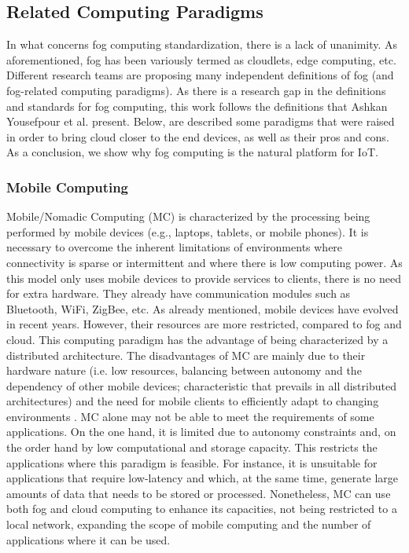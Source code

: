 \subsection{Related Computing Paradigms}
\label{sec:Computingparadigms}
\noindent In what concerns fog computing standardization, there is a lack of unanimity. As aforementioned, fog has been variously termed as cloudlets, edge computing, etc. Different research teams are proposing many independent definitions of fog (and fog-related computing paradigms). As there is a research gap in the definitions and standards for fog computing, this work follows the definitions that Ashkan Yousefpour et al. \cite{yousefpour2018all} present. Below, are described some paradigms that were raised in order to bring cloud closer to the end devices, as well as their pros and cons. As a conclusion, we show why fog computing is the natural platform for IoT.

\subsubsection{Mobile Computing}\label{subsec:MC}
\noindent Mobile/Nomadic Computing (MC) is characterized by the processing being performed by mobile devices (e.g., laptops, tablets, or mobile phones). It is necessary to overcome the inherent limitations of environments where connectivity is sparse or intermittent and where there is low computing power. As this model only uses mobile devices to provide services to clients, there is no need for extra hardware. They already have communication modules such as Bluetooth, WiFi, ZigBee, etc. As already mentioned, mobile devices have evolved in recent years. However, their resources are more restricted, compared to fog and cloud. This computing paradigm has the advantage of being characterized by a distributed architecture. The disadvantages of MC are mainly due to their hardware nature (i.e. low resources, balancing between autonomy and the dependency of other mobile devices; characteristic that prevails in all distributed architectures) and the need for mobile clients to efficiently adapt to changing environments \cite{satyanarayanan1996fundamental}. MC alone may not be able to meet the requirements of some applications. On the one hand, it is limited due to autonomy constraints and, on the order hand by low computational and storage capacity. This restricts the applications where this paradigm is feasible. For instance, it is unsuitable for applications that require low-latency and which, at the same time, generate large amounts of data that needs to be stored or processed. Nonetheless, MC can use both fog and cloud computing to enhance its capacities, not being restricted to a local network, expanding the scope of mobile computing and the number of applications where it can be used.

